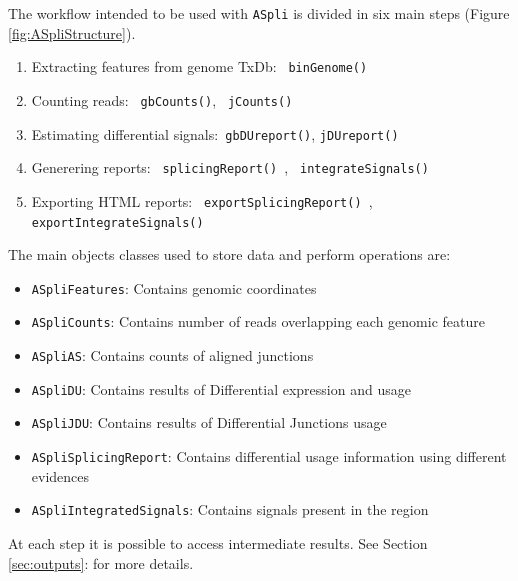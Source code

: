 \documentclass{article}
\begin{document}
The workflow intended to be used with \texttt{ASpli} is divided in six main steps (Figure \ref{fig:ASpliStructure}). 
\begin{enumerate}
  \item Extracting features from genome TxDb: \texttt{ binGenome() }
  \item Counting reads:  \texttt{ gbCounts()},  \texttt{ jCounts()}
  \item Estimating differential signals:\texttt{ gbDUreport()}, 
  \texttt{jDUreport()}
  \item Generering reports: \texttt{ splicingReport() }, \texttt{ integrateSignals() }
  \item Exporting HTML reports: \texttt{ exportSplicingReport() }, \texttt{ exportIntegrateSignals() }
  
\end{enumerate}

The main objects classes used to store data and perform operations are:
\begin{itemize}
  \item \texttt{ASpliFeatures}: Contains genomic coordinates
  \item \texttt{ASpliCounts}: Contains number of reads overlapping each genomic feature
  \item \texttt{ASpliAS}: Contains counts of aligned junctions   
  \item \texttt{ASpliDU}: Contains results of Differential expression and usage
  \item \texttt{ASpliJDU}: Contains results of Differential Junctions usage
  \item \texttt{ASpliSplicingReport}: Contains differential usage information using different evidences
  \item \texttt{ASpliIntegratedSignals}: Contains signals present in the region
  \end{itemize}
  
At each step it is possible to access intermediate results. 
See Section \ref{sec:outputs}: for more details.
\end{document}
